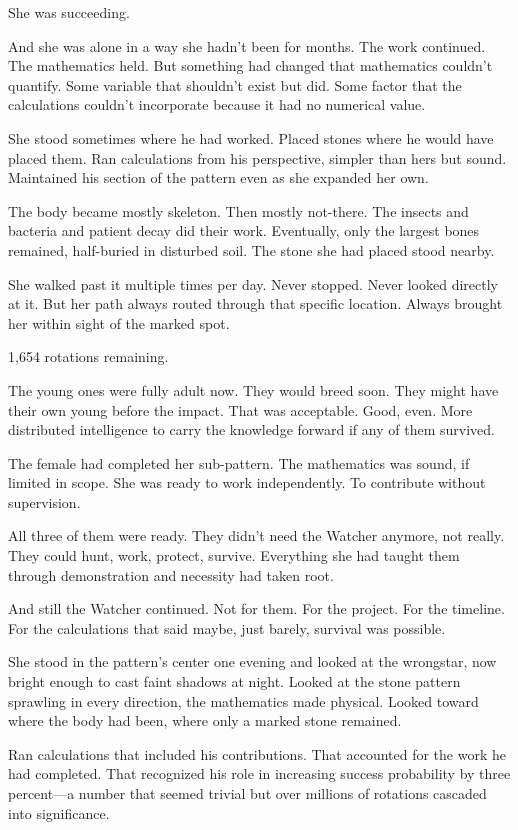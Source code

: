 She was succeeding.

And she was alone in a way she hadn't been for months. The work continued. The mathematics held. But something had changed that mathematics couldn't quantify. Some variable that shouldn't exist but did. Some factor that the calculations couldn't incorporate because it had no numerical value.

She stood sometimes where he had worked. Placed stones where he would have placed them. Ran calculations from his perspective, simpler than hers but sound. Maintained his section of the pattern even as she expanded her own.

The body became mostly skeleton. Then mostly not-there. The insects and bacteria and patient decay did their work. Eventually, only the largest bones remained, half-buried in disturbed soil. The stone she had placed stood nearby.

She walked past it multiple times per day. Never stopped. Never looked directly at it. But her path always routed through that specific location. Always brought her within sight of the marked spot.

1,654 rotations remaining.

The young ones were fully adult now. They would breed soon. They might have their own young before the impact. That was acceptable. Good, even. More distributed intelligence to carry the knowledge forward if any of them survived.

The female had completed her sub-pattern. The mathematics was sound, if limited in scope. She was ready to work independently. To contribute without supervision.

All three of them were ready. They didn't need the Watcher anymore, not really. They could hunt, work, protect, survive. Everything she had taught them through demonstration and necessity had taken root.

And still the Watcher continued. Not for them. For the project. For the timeline. For the calculations that said maybe, just barely, survival was possible.

She stood in the pattern's center one evening and looked at the wrongstar, now bright enough to cast faint shadows at night. Looked at the stone pattern sprawling in every direction, the mathematics made physical. Looked toward where the body had been, where only a marked stone remained.

Ran calculations that included his contributions. That accounted for the work he had completed. That recognized his role in increasing success probability by three percent—a number that seemed trivial but over millions of rotations cascaded into significance.

